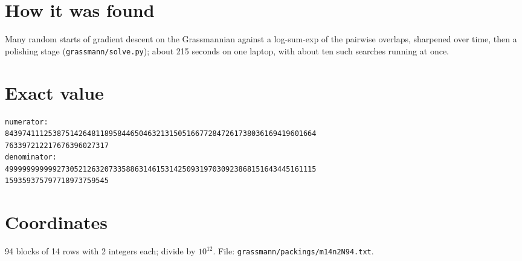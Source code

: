 \documentclass[11pt,a4paper]{article}
\begin{document}
\section{How it was found}
Many random starts of gradient descent on the Grassmannian against a log-sum-exp of the pairwise overlaps, sharpened over time, then a polishing stage (\texttt{grassmann/solve.py}); about 215 seconds on one laptop, with about ten such searches running at once.


\appendix
\section{Exact value}
{\small
\begin{verbatim}
numerator:
843974111253875142648118958446504632131505166772847261738036169419601664
763397212217676396027317
denominator:
499999999999273052126320733588631461531425093197030923868151643445161115
159359375797718973759545
\end{verbatim}}

\section{Coordinates}
94 blocks of 14 rows with 2 integers each; divide by $10^{12}$. File: \texttt{grassmann/packings/m14n2N94.txt}.
{\tiny
\begin{multicols}{4}
\end{multicols}}
\end{document}
